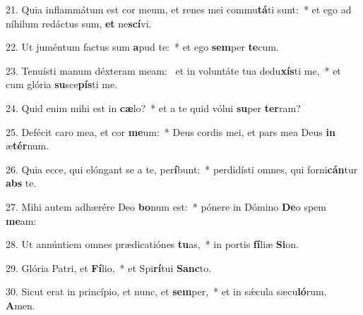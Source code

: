 21. Quia inflammátum est cor meum, et renes mei commu\textbf{tá}ti sunt:~*  et ego ad níhilum redáctus sum, \textbf{et} ne\textbf{scí}vi.\

22. Ut juméntum factus sum \textbf{a}pud te:~*  et ego \textbf{sem}per \textbf{te}cum.\

23. Tenuísti manum déxteram meam: \dag\  et in voluntáte tua dedu\textbf{xís}ti me,~*  et cum glória \textbf{su}sce\textbf{pís}ti me.\

24. Quid enim mihi est in \textbf{cæ}lo?~*  et a te quid vólui \textbf{su}per \textbf{ter}ram?\

25. Defécit caro mea, et cor \textbf{me}um:~*  Deus cordis mei, et pars mea Deus \textbf{in} æ\textbf{tér}num.\

26. Quia ecce, qui elóngant se a te, per\textbf{í}bunt:~*  perdidísti omnes, qui forni\textbf{cán}tur \textbf{abs} te.\

27. Mihi autem adhærére Deo \textbf{bo}num est:~*  pónere in Dómino \textbf{De}o spem \textbf{me}am:\

28. Ut annúntiem omnes prædicatiónes \textbf{tu}as,~*  in portis \textbf{fí}liæ \textbf{Si}on.\

29. Glória Patri, et \textbf{Fí}lio,~*  et Spi\textbf{rí}tui \textbf{Sanc}to.\

30. Sicut erat in princípio, et nunc, et \textbf{sem}per,~*  et in sǽcula sæcu\textbf{ló}rum. \textbf{A}men.\

